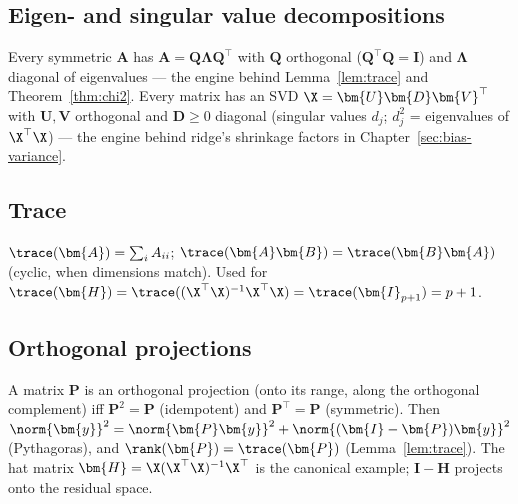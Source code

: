\subsection{Eigen- and singular value decompositions}

Every symmetric $\bm{A}$ has $\bm{A} = \bm{Q}\bm{\Lambda}\bm{Q}^\top$ with $\bm{Q}$ orthogonal ($\bm{Q}^\top\bm{Q} = \bm{I}$) and $\bm{\Lambda}$ diagonal of eigenvalues — the engine behind Lemma~\ref{lem:trace} and Theorem~\ref{thm:chi2}. Every matrix has an SVD $\X = \bm{U}\bm{D}\bm{V}^\top$ with $\bm{U}, \bm{V}$ orthogonal and $\bm{D} \geq 0$ diagonal (singular values $d_j$; $d_j^2$ = eigenvalues of $\X^\top\X$) — the engine behind ridge's shrinkage factors in Chapter~\ref{sec:bias-variance}.

\subsection{Trace}

$\trace(\bm{A}) = \sum_i A_{ii}$; $\trace(\bm{A}\bm{B}) = \trace(\bm{B}\bm{A})$ (cyclic, when dimensions match). Used for $\trace(\bm{H}) = \trace((\X^\top\X)^{-1}\X^\top\X) = \trace(\bm{I}_{p+1}) = p+1$.

\subsection{Orthogonal projections}

A matrix $\bm{P}$ is an orthogonal projection (onto its range, along the orthogonal complement) iff $\bm{P}^2 = \bm{P}$ (idempotent) and $\bm{P}^\top = \bm{P}$ (symmetric). Then $\norm{\bm{y}}^2 = \norm{\bm{P}\bm{y}}^2 + \norm{(\bm{I}-\bm{P})\bm{y}}^2$ (Pythagoras), and $\rank(\bm{P}) = \trace(\bm{P})$ (Lemma~\ref{lem:trace}). The hat matrix $\bm{H} = \X(\X^\top\X)^{-1}\X^\top$ is the canonical example; $\bm{I} - \bm{H}$ projects onto the residual space.
